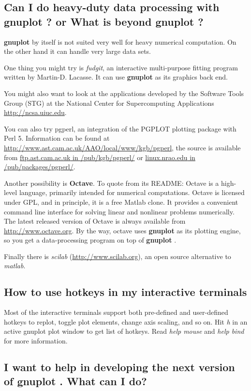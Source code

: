 \documentclass[a4paper,11pt]{article}
\def\http#1{{\small\href{http://#1}{\url{http://#1}}}}
\def\ftp#1#2{\href{ftp://#1#2}{\url{#1} in \url{#2}}}
\newcommand{\ftp}[2]%
            {\htmladdnormallink{\latex{\url{#1}{} in \url{#2}}%
                    \html{\textit{#1} in \textit{#2}}}%
                {ftp://#1#2}%
            }
\newcommand{\http}[1]%
            {\htmladdnormallink{\latex{\url{http://#1}}%
                    \html{\textit{http://#1}}}%
                {http://#1}%
            }
\newcommand{\gnuplot}{\textbf{gnuplot }}
\begin{document}
\subsection{Can I do heavy-duty data processing with \gnuplot? or
What is beyond \gnuplot?}

\gnuplot by itself is not suited very well for heavy numerical computation.
On the other hand it can handle very large data sets.

One thing you might try is \textit{fudgit}, an interactive multi-purpose
fitting program written by Martin-D. Lacasse.
It can use \gnuplot as its graphics back end.

You might also want to look at the applications developed by
the Software Tools Group (STG) at the National Center for
Supercomputing Applications \http{ncsa.uiuc.edu}.

You can also try pgperl, an integration of the PGPLOT plotting
package with Perl 5. Information can be found at
\http{www.ast.cam.ac.uk/AAO/local/www/kgb/pgperl}, the source is
available from \ftp{ftp.ast.cam.ac.uk}{/pub/kgb/pgperl/} or
\ftp{linux.nrao.edu}{/pub/packages/pgperl/}.

Another possibility is \textbf{Octave}. To quote from its README: Octave is a
high-level language, primarily intended for numerical computations. Octave is
licensed under GPL, and in principle, it is a free Matlab clone. It provides a
convenient command line interface for solving linear and nonlinear problems
numerically. The latest released version of Octave is always available from
\http{www.octave.org}. By the way, octave uses \gnuplot as its plotting
engine, so you get a data-processing program on top of \gnuplot.

Finally there is \textit{scilab} (\http{www.scilab.org}), an open source
alternative to \textit{matlab}.


\subsection{How to use hotkeys in my interactive terminals}

Most of the interactive terminals support both pre-defined and user-defined
hotkeys to replot, toggle plot elements, change axis scaling, and so on.
Hit \textit{h} in an active gnuplot plot window to get list of hotkeys.
Read \textit{help mouse} and \textit{help bind} for more information.


\subsection{I want to help in developing the next version of \gnuplot.
What can I do?}
\end{document}
